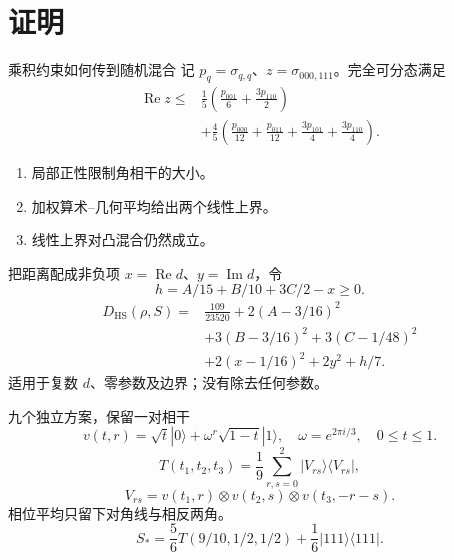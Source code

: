\documentclass{beamer}
\begin{document}
\section{证明}
\begin{frame}{乘积约束如何传到随机混合}
记 $p_q=\sigma_{q,q}$、$z=\sigma_{000,111}$。完全可分态满足
\[
\begin{split}
\operatorname{Re}z\le{}&\frac15\left(\frac{p_{001}}6+\frac{3p_{110}}2\right)\\
&+\frac45\left(\frac{p_{000}}{12}+\frac{p_{011}}{12}
+\frac{3p_{101}}4+\frac{3p_{110}}4\right).
\end{split}
\]
\begin{enumerate}
\item 局部正性限制角相干的大小。
\item 加权算术--几何平均给出两个线性上界。
\item 线性上界对凸混合仍然成立。
\end{enumerate}
\end{frame}
\begin{frame}{把距离配成非负项}
$x=\operatorname{Re}d$、$y=\operatorname{Im}d$，令
\[
h=A/15+B/10+3C/2-x\ge0.
\]
\[
\begin{aligned}
D_{\mathrm{HS}}(\rho,S)={}&\frac{109}{23520}+2(A-3/16)^2\\
&+3(B-3/16)^2+3(C-1/48)^2\\
&+2(x-1/16)^2+2y^2+h/7.
\end{aligned}
\]
适用于复数 $d$、零参数及边界；没有除去任何参数。
\end{frame}
\begin{frame}{九个独立方案，保留一对相干}
\[
v(t,r)=\sqrt t|0\rangle+\omega^r\sqrt{1-t}|1\rangle,
\quad\omega=e^{2\pi i/3},\quad0\le t\le1.
\]
\[
T(t_1,t_2,t_3)=\frac19\sum_{r,s=0}^2|V_{rs}\rangle\langle V_{rs}|,
\]
\[
V_{rs}=v(t_1,r)\otimes v(t_2,s)\otimes v(t_3,-r-s).
\]
相位平均只留下对角线与相反两角。
\[
S_*=\frac56T(9/10,1/2,1/2)+\frac16|111\rangle\langle111|.
\]
\end{frame}
\end{document}
